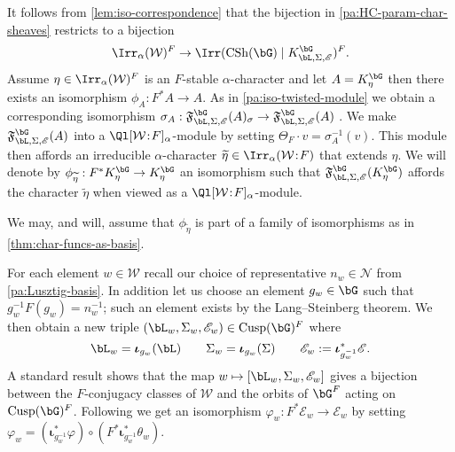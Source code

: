 \documentclass[eqthmnum,nocolour,skinny]{jt-calcs}
\DeclareMathOperator{\CS}{CSh}
\DeclareMathOperator{\Cusp}{Cusp}
\newcommand\sd{
	\mathchoice{\mkern1.5mu}{\mkern1.5mu}{}{}%
	{:}%
	\mathchoice{\mkern1.5mu}{\mkern1.5mu}{}{}
}
\begin{document}
\begin{pa}
It follows from \cref{lem:iso-correspondence} that the bijection in \cref{pa:HC-param-char-sheaves} restricts to a bijection
\begin{equation*}
\Irr_{\alpha}(\mathcal{W})^F \to \Irr(\CS(\bG) \mid K_{\bL,\Sigma,\mathscr{E}}^{\bG})^F.
\end{equation*}
Assume $\eta \in \Irr_{\alpha}(\mathcal{W})^F$ is an $F$-stable $\alpha$-character and let $A = K_{\eta}^{\bG}$ then there exists an isomorphism $\phi_A : F^*A \to A$. As in \cref{pa:iso-twisted-module} we obtain a corresponding isomorphism $\sigma_A : \mathfrak{F}_{\bL,\Sigma,\mathscr{E}}^{\bG}(A)_{\sigma} \to \mathfrak{F}_{\bL,\Sigma,\mathscr{E}}^{\bG}(A)$ . We make $\mathfrak{F}_{\bL,\Sigma,\mathscr{E}}^{\bG}(A)$ into a $\Ql[\mathcal{W}\sd F]_{\alpha}$-module by setting $\Theta_F\cdot v = \sigma_A^{-1}(v)$. This module then affords an irreducible $\alpha$-character $\widetilde{\eta} \in \Irr_{\alpha}(\mathcal{W}\sd F)$ that extends $\eta$. We will denote by $\phi_{\widetilde{\eta}} : F^*K_{\eta}^{\bG} \to K_{\eta}^{\bG}$ an isomorphism such that $\mathfrak{F}_{\bL,\Sigma,\mathscr{E}}^{\bG}(K_{\eta}^{\bG})$ affords the character $\widetilde{\eta}$ when viewed as a $\Ql[\mathcal{W}\sd F]_{\alpha}$-module.
\end{pa}

\begin{rem}\label{rem:choice-of-isos}
We may, and will, assume that $\phi_{\widetilde{\eta}}$ is part of a family of isomorphisms as in \cref{thm:char-funcs-as-basis}.
\end{rem}

\begin{pa}
For each element $w \in \mathcal{W}$ recall our choice of representative $n_w \in \mathcal{N}$ from \cref{pa:Lusztig-basis}. In addition let us choose an element $g_w \in \bG$ such that $g_w^{-1}F(g_w) = n_w^{-1}$; such an element exists by the Lang--Steinberg theorem. We then obtain a new triple $(\bL_w,\Sigma_w,\mathscr{E}_w) \in \Cusp(\bG)^F$ where
\begin{equation*}
\bL_w = \boldsymbol{\iota}_{g_w}(\bL) \qquad \Sigma_w = \boldsymbol{\iota}_{g_w}(\Sigma) \qquad \mathscr{E}_w := \boldsymbol{\iota}_{g_w^{-1}}^*\mathscr{E}.
\end{equation*}
A standard result shows that the map $w \mapsto [\bL_w,\Sigma_w,\mathscr{E}_w]$ gives a bijection between the $F$-conjugacy classes of $\mathcal{W}$ and the orbits of $\bG^F$ acting on $\Cusp(\bG)^F$. Following \cite[10.6]{lusztig:1985:character-sheaves} we get an isomorphism $\varphi_w : F^*\mathscr{E}_w \to \mathscr{E}_w$ by setting $\varphi_w = (\boldsymbol{\iota}_{g_w^{-1}}^*\varphi) \circ (F^*\boldsymbol{\iota}_{g_w^{-1}}^*\theta_w)$.
\end{pa}
\end{document}
